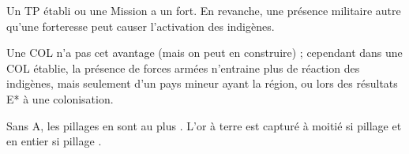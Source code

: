 \aparag Un TP établi ou une Mission a un fort. En revanche, une présence militaire
autre qu'une forteresse peut causer l'activation des indigènes.

\aparag Une COL n'a pas cet avantage (mais on peut en construire) ;
cependant dans une COL établie, la présence de forces armées
n'entraine plus de réaction des indigènes, mais
seulement d'un pays mineur ayant la région, ou lors des
résultats E* à une colonisation.

\aparag[Pillages]
\bparag Sans A, les pillages en \ROTW sont au plus \Facemoins.
\bparag L'or à terre est capturé à moitié si pillage \Facemoins et en
entier si pillage \Faceplus.

